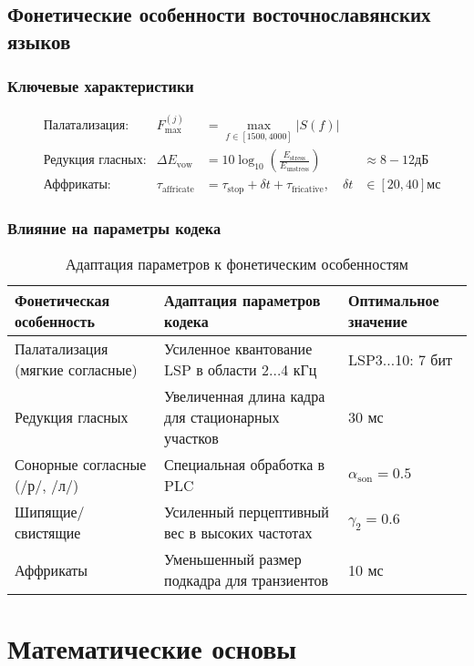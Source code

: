 \documentclass{report}
\begin{document}
	\newpage
	
	\section{Фонетические особенности восточнославянских языков}
	\subsection{Ключевые характеристики}
	\begin{align}
		&\text{Палатализация:} & F_{\text{max}}^{(j)} &= \max_{f \in [1500,4000]} |S(f)| \\
		&\text{Редукция гласных:} & \Delta E_{\text{vow}} &= 10 \log_{10} \left( \frac{E_{\text{stress}}}{E_{\text{unstress}}} \right) &\approx 8-12 \text{дБ} \\
		&\text{Аффрикаты:} & \tau_{\text{affricate}} &= \tau_{\text{stop}} + \delta t + \tau_{\text{fricative}}, \quad \delta t &\in [20,40] \text{мс}
	\end{align}
	
	\subsection{Влияние на параметры кодека}
	\begin{table}[H]
		\centering
		\caption{Адаптация параметров к фонетическим особенностям}
		\begin{tabular}{p{4cm}p{6cm}p{3cm}}
			\toprule
			\textbf{Фонетическая особенность} & \textbf{Адаптация параметров кодека} & \textbf{Оптимальное значение} \\
			\midrule
			Палатализация (мягкие согласные) & Усиленное квантование LSP в области 2$\ldots$4 кГц & LSP3$\ldots$10: 7 бит \\
			Редукция гласных & Увеличенная длина кадра для стационарных участков & 30 мс \\
			Сонорные согласные (/р/, /л/) & Специальная обработка в PLC & $\alpha_{\text{son}} = 0.5$ \\
			Шипящие/свистящие & Усиленный перцептивный вес в высоких частотах & $\gamma_2 = 0.6$ \\
			Аффрикаты & Уменьшенный размер подкадра для транзиентов & 10 мс \\
			\bottomrule
		\end{tabular}
	\end{table}
	
	\chapter{Математические основы}
\end{document}
